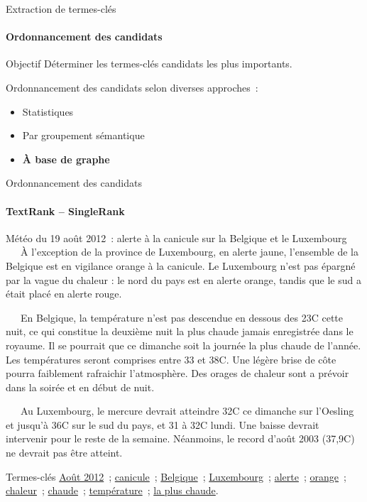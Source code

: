   \begin{frame}{Extraction de termes-clés}\framesubtitle{Ordonnancement des candidats}
    \begin{block}{Objectif}
      Déterminer les termes-clés candidats les plus importants.
    \end{block}

    \vspace{1em}

    Ordonnancement des candidats selon diverses approches~:
    \begin{itemize}
      \item{Statistiques~\cite[TF-IDF]{salton1975tfidf}}
      \item{Par groupement sémantique~\cite{matsuo2004wordcooccurrence}}
      \item{\textbf{À base de graphe}~\cite[TextRank]{mihalcea2004textrank}}
    \end{itemize}
  \end{frame}

  \begin{frame}{Ordonnancement des candidats}\framesubtitle{TextRank -- SingleRank}
    \begin{exampleblock}{\small
      Météo du 19 août 2012~: alerte à la canicule sur la Belgique et le
      Luxembourg
    }\justifying\small
      ~~~À l'exception de la province de Luxembourg, en alerte jaune, l'ensemble
      de la Belgique est en vigilance orange à la canicule. Le Luxembourg n'est
      pas épargné par la vague du chaleur : le nord du pays est en alerte
      orange, tandis que le sud a était placé en alerte rouge.

      ~~~En Belgique, la température n'est pas descendue en dessous des
      23\degre{}C cette nuit, ce qui constitue la deuxième nuit la plus chaude
      jamais enregistrée dans le royaume. Il se pourrait que ce dimanche soit la
      journée la plus chaude de l'année. Les températures seront comprises entre
      33 et 38\degre{}C. Une légère brise de côte pourra faiblement rafraichir
      l'atmosphère. Des orages de chaleur sont a prévoir dans la soirée et en
      début de nuit.

      ~~~Au Luxembourg, le mercure devrait atteindre 32\degre{}C ce dimanche sur
      l'Oesling et jusqu'à 36\degre{}C sur le sud du pays, et 31 à 32\degre{}C
      lundi. Une baisse devrait intervenir pour le reste de la semaine.
      Néanmoins, le record d'août 2003 (37,9\degre{}C) ne devrait pas être
      atteint.

      \begin{exampleblock}{\small Termes-clés}\justifying\small
        \underline{Août 2012}~; \underline{canicule}~;
        \underline{Belgique}~; \underline{Luxembourg}~; \underline{alerte}~;
        \underline{orange}~; \underline{chaleur}~; \underline{chaude}~;
        \underline{température}~; \underline{la plus chaude}.
      \end{exampleblock}
    \end{exampleblock}
  \end{frame}

